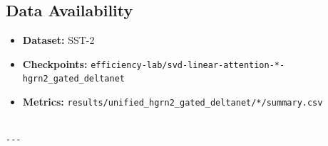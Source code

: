 \subsection{Data Availability}

\begin{itemize}
\item \textbf{Dataset:} SST-2
\item \textbf{Checkpoints:} \texttt{efficiency-lab/svd-linear-attention-*-hgrn2\_gated\_deltanet}
\item \textbf{Metrics:} \texttt{results/unified\_hgrn2\_gated\_deltanet/*/summary.csv}
\end{itemize}
\begin{lstlisting}

---
\end{lstlisting}